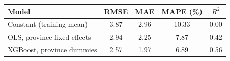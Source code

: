 \begin{tabular}{@{}lcccc@{}}
\toprule
Model & RMSE & MAE & MAPE (\%) & $R^2$ \\
\midrule
Constant (training mean) & 3.87 & 2.96 & 10.33 & 0.00 \\
OLS, province fixed effects & 2.94 & 2.25 & 7.87 & 0.42 \\
XGBoost, province dummies & 2.57 & 1.97 & 6.89 & 0.56 \\
\bottomrule
\end{tabular}
